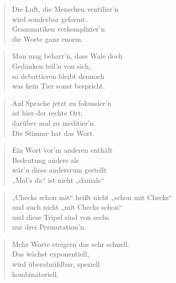 \documentclass[10pt,a4paper]{article}
\begin{document}
\begin{multicols}{2}
\begin{verse}
Die Luft, die Menschen ventilier’n \\
wird sonderbar geformt. \\
Grammatiken verkomplizier’n \\
die Worte ganz enorm. \\
\end{verse}

\begin{verse}
Man mag beharr’n, dass Wale doch \\
Gedanken teil’n von sich, \\
so debattieren bleibt dennoch \\
was kein Tier sonst bespricht. \\
\end{verse}

\begin{verse}
Auf Sprache jetzt zu fokussier’n \\
ist hier der rechte Ort; \\
darüber mal zu meditier’n. \\
Die Stimme hat das Wort. \\
\end{verse}

\begin{verse}
Ein Wort vor’m anderen enthält \\
Bedeutung anders als \\
wär’n diese andersrum gestellt \\
„Mal’s da“ ist nicht „damals“ \\
\end{verse}

\begin{verse}
„Checks schon mit“ heißt nicht „schon mit Checks“ \\
und auch nicht „mit Checks schon“ \\
und diese Tripel sind von sechs \\
nur drei Permutation’n. \\
\end{verse}

\begin{verse}
Mehr Worte steigern das sehr schnell. \\
Das wächst exponentiell, \\
wird überabzählbar, speziell \\
kombinatoriell. \\
\end{verse}


\end{multicols}
\end{document}
